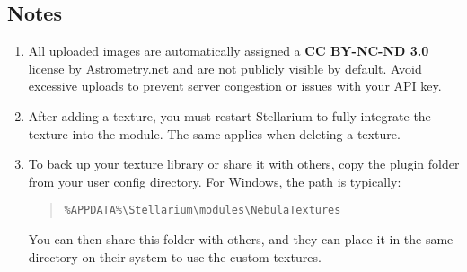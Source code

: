 \subsection{Notes}
\begin{enumerate}
    \item All uploaded images are automatically assigned a \textbf{CC BY-NC-ND 3.0} license by Astrometry.net 
	and are not publicly visible by default. Avoid excessive uploads to prevent server 
	congestion or issues with your API key.
    \item After adding a texture, you must restart Stellarium to fully integrate the texture into the 
	module. The same applies when deleting a texture.
    \item To back up your texture library or share it with others, copy the plugin folder from your user 
	config directory. For Windows, the path is typically:
    \begin{quote}
    \texttt{\%APPDATA\%\textbackslash Stellarium\textbackslash modules\textbackslash NebulaTextures}
    \end{quote}
    You can then share this folder with others, and they can place it in the same directory on 
	their system to use the custom textures.
\end{enumerate}



